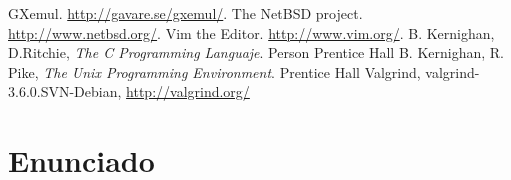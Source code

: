 \documentclass[a4paper, 10pt, twoside, notitlepage]{article}
\begin{document}
\lipsum[3-3]


\vspace{.5cm}
 \begin{thebibliography}{5}
 \bibitem{} GXemul. \url{http://gavare.se/gxemul/}.
 \bibitem{} The NetBSD project. \url{http://www.netbsd.org/}.
 \bibitem{} Vim the Editor. \url{http://www.vim.org/}.
 \bibitem{} B. Kernighan, D.Ritchie, \textit{The C Programming Languaje}. Person Prentice Hall 
 \bibitem{} B. Kernighan, R. Pike, \textit{The Unix Programming Environment}. Prentice Hall
  Valgrind, valgrind-3.6.0.SVN-Debian, \url{http://valgrind.org/}
\end{thebibliography}
 
\newpage

 \appendix
 \section{Enunciado}
 
%  
\end{document}
